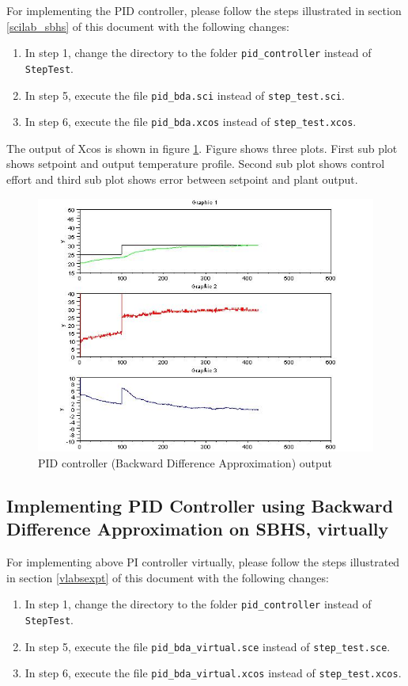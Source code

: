 For implementing the PID controller, please follow the steps illustrated in section \ref{scilab_sbhs} of this document with the 
following changes:
\begin{enumerate}

\item In step 1, change the directory to the folder {\tt pid\_controller} instead of {\tt StepTest}.
\item In step 5, execute the file {\tt pid\_bda.sci} instead of {\tt step\_test.sci}.
\item In step 6, execute the file {\tt pid\_bda.xcos} instead of {\tt step\_test.xcos}.

\end{enumerate}

The output of Xcos is shown in figure \ref{pid_bda}.
Figure shows three plots. First sub plot shows setpoint and output temperature profile. Second sub plot shows 
control effort and third sub plot shows error between setpoint and plant output.


\begin{figure}
\centering
\includegraphics[width=0.7\linewidth]{pid_manual/pid_bda_graph}
\caption{PID controller (Backward Difference Approximation) output}
\label{pid_bda}
\end{figure}


\subsection{Implementing PID Controller using Backward Difference Approximation on SBHS, virtually}
For implementing above PI controller virtually, please follow the steps illustrated in section \ref{vlabsexpt} of this 
document with the following changes:
\begin{enumerate}

\item In step 1, change the directory to the folder {\tt pid\_controller} instead of {\tt StepTest}.
\item In step 5, execute the file {\tt pid\_bda\_virtual.sce} instead of {\tt step\_test.sce}.
\item In step 6, execute the file {\tt pid\_bda\_virtual.xcos} instead of {\tt step\_test.xcos}.

\end{enumerate}


